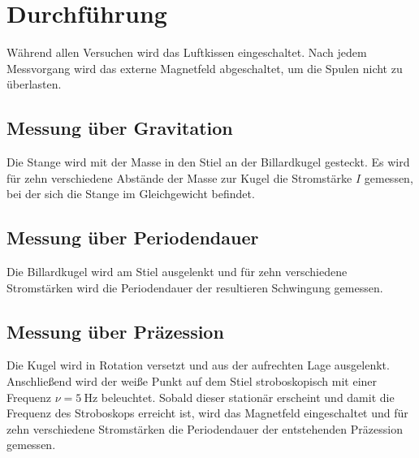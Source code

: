 \section{Durchführung}
\label{sec:Durchführung}

Während allen Versuchen wird das Luftkissen eingeschaltet.
Nach jedem Messvorgang wird das externe Magnetfeld abgeschaltet, um die Spulen nicht zu überlasten.

\subsection{Messung über Gravitation} 

Die Stange wird mit der Masse in den Stiel an der Billardkugel gesteckt.
Es wird für zehn verschiedene Abstände der Masse zur Kugel die Stromstärke $I$ gemessen, bei der sich die Stange im Gleichgewicht befindet.

\subsection{Messung über Periodendauer}

Die Billardkugel wird am Stiel ausgelenkt und für zehn verschiedene Stromstärken wird die Periodendauer der resultieren Schwingung gemessen.

\subsection{Messung über Präzession}

Die Kugel wird in Rotation versetzt und aus der aufrechten Lage ausgelenkt.
Anschließend wird der weiße Punkt auf dem Stiel stroboskopisch mit einer Frequenz $\nu = \SI{5}{\hertz}$ beleuchtet. 
Sobald dieser stationär erscheint und damit die Frequenz des Stroboskops erreicht ist, wird das Magnetfeld eingeschaltet und für zehn verschiedene Stromstärken die Periodendauer der entstehenden Präzession gemessen.

